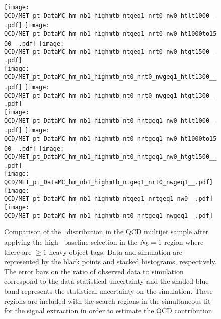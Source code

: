 \begin{figure}[!h]
	\begin{center}
  \texttt{[image: QCD/MET\_pt\_DataMC\_hm\_nb1\_highmtb\_ntgeq1\_nrt0\_nw0\_htlt1000\_\_.pdf]}
  \texttt{[image: QCD/MET\_pt\_DataMC\_hm\_nb1\_highmtb\_ntgeq1\_nrt0\_nw0\_ht1000to1500\_\_.pdf]}
  \texttt{[image: QCD/MET\_pt\_DataMC\_hm\_nb1\_highmtb\_ntgeq1\_nrt0\_nw0\_htgt1500\_\_.pdf]} \\
  \texttt{[image: QCD/MET\_pt\_DataMC\_hm\_nb1\_highmtb\_nt0\_nrt0\_nwgeq1\_htlt1300\_\_.pdf]} 
  \texttt{[image: QCD/MET\_pt\_DataMC\_hm\_nb1\_highmtb\_nt0\_nrt0\_nwgeq1\_htgt1300\_\_.pdf]} \\
  \texttt{[image: QCD/MET\_pt\_DataMC\_hm\_nb1\_highmtb\_nt0\_nrtgeq1\_nw0\_htlt1000\_\_.pdf]} 
  \texttt{[image: QCD/MET\_pt\_DataMC\_hm\_nb1\_highmtb\_nt0\_nrtgeq1\_nw0\_ht1000to1500\_\_.pdf]} 
  \texttt{[image: QCD/MET\_pt\_DataMC\_hm\_nb1\_highmtb\_nt0\_nrtgeq1\_nw0\_htgt1500\_\_.pdf]} \\
  \texttt{[image: QCD/MET\_pt\_DataMC\_hm\_nb1\_highmtb\_ntgeq1\_nrt0\_nwgeq1\_\_.pdf]} 
  \texttt{[image: QCD/MET\_pt\_DataMC\_hm\_nb1\_highmtb\_ntgeq1\_nrtgeq1\_nw0\_\_.pdf]} 
  \texttt{[image: QCD/MET\_pt\_DataMC\_hm\_nb1\_highmtb\_nt0\_nrtgeq1\_nwgeq1\_\_.pdf]} \\
	\end{center}
	\caption[QCD Multijet HM Control Region $\nb=1$]{Comparison of the \met~distribution in the QCD multijet sample after applying the high \dm~baseline selection in the $\nb=1$ region where there are $\geq1$ heavy object tags. Data and simulation are represented by the black points and stacked histograms, respectively. The error bars on the ratio of observed data to simulation correspond to the data statistical uncertainty and the shaded blue band represents the statistical uncertainty on the simulation. These regions are included with the search regions in the simultaneous fit for the signal extraction in order to estimate the QCD contribution.
	 }
	\label{fig:qcd-cr-datavsmc-hm-nb1}
\end{figure}

